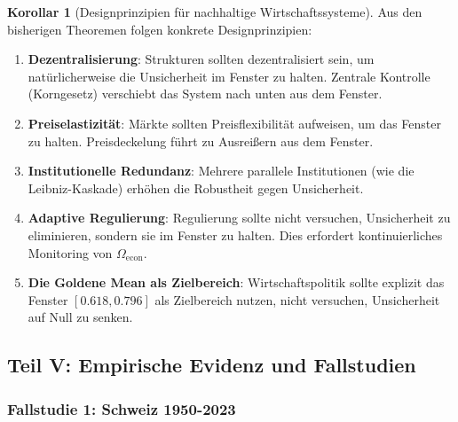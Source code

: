 \documentclass[a4paper, 12pt, twoside, openright]{report}
\theoremstyle{definition}
\theoremstyle{definition}
\newtheorem{korollar}{Korollar}[chapter]
\begin{document}
\begin{korollar}[Designprinzipien für nachhaltige Wirtschaftssysteme]

Aus den bisherigen Theoremen folgen konkrete Designprinzipien:

\begin{enumerate}
	\item \textbf{Dezentralisierung}: Strukturen sollten dezentralisiert sein, um natürlicherweise die Unsicherheit im Fenster zu halten. Zentrale Kontrolle (Korngesetz) verschiebt das System nach unten aus dem Fenster.
	
	\item \textbf{Preiselastizität}: Märkte sollten Preisflexibilität aufweisen, um das Fenster zu halten. Preisdeckelung führt zu Ausreißern aus dem Fenster.
	
	\item \textbf{Institutionelle Redundanz}: Mehrere parallele Institutionen (wie die Leibniz-Kaskade) erhöhen die Robustheit gegen Unsicherheit.
	
	\item \textbf{Adaptive Regulierung}: Regulierung sollte nicht versuchen, Unsicherheit zu eliminieren, sondern sie im Fenster zu halten. Dies erfordert kontinuierliches Monitoring von $\Omega_{\text{econ}}$.
	
	\item \textbf{Die Goldene Mean als Zielbereich}: Wirtschaftspolitik sollte explizit das Fenster $[0.618, 0.796]$ als Zielbereich nutzen, nicht versuchen, Unsicherheit auf Null zu senken.
\end{enumerate}

\end{korollar}

\subsection{Teil V: Empirische Evidenz und Fallstudien}

\subsubsection{Fallstudie 1: Schweiz 1950-2023}
\end{document}

